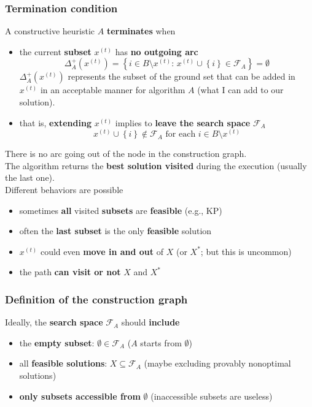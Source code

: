 \newpage

\subsubsection{Termination condition} 
A constructive heuristic $A$ \textbf{terminates} when
\begin{itemize}
	\item the current \textbf{subset} $x^{(t)}$ has \textbf{no outgoing arc}
	$$ \Delta^+_A \left(x^{(t)}\right) = \left\{i \in B \setminus x^{(t)} : \, x^{(t)} \cup \left\{i\right\} \in \mathcal{F}_A \right\} = \emptyset $$
	$\Delta^+_A \left(x^{(t)}\right)$ represents the subset of the ground set that can be added in $x^{(t)}$ in an acceptable manner for algorithm $A$ (what I can add to our solution).\\
	
	\item that is, \textbf{extending} $x^{(t)}$ implies to \textbf{leave the search space} $\mathcal{F}_A$
	$$ x^{(t)} \cup \left\{i\right\} \notin \mathcal{F}_A \text{ for each } i \in B \setminus x^{(t)}$$
\end{itemize}

There is no arc going out of the node in the construction graph.\\

The algorithm returns the \textbf{best solution visited} during the execution (usually the last one).\\

Different behaviors are possible
\begin{itemize}
	\item sometimes \textbf{all} visited \textbf{subsets} are \textbf{feasible} (e.g., KP)
	\item often the \textbf{last subset} is the only \textbf{feasible} solution
	\item $x^{(t)}$ could even \textbf{move in and out} of $X$ (or $X^\ast$; but this is uncommon)
	\item the path \textbf{can visit or not} $X$ and $X^\ast$
\end{itemize}

\newpage

\subsubsection{Definition of the construction graph}
Ideally, the \textbf{search space} $\mathcal{F}_A$ should \textbf{include}
\begin{itemize}
	\item the \textbf{empty subset}: $\emptyset \in \mathcal{F}_A$ ($A$ starts from $\emptyset$)
	\item all \textbf{feasible solutions}: $X \subseteq \mathcal{F}_A$ (maybe excluding provably nonoptimal solutions)
	\item \textbf{only subsets accessible from} $\emptyset$ (inaccessible subsets are useless)
\end{itemize}

